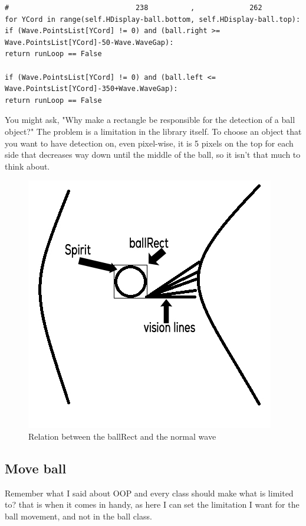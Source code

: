 \begin{listing}[H]
\begin{verbatim}
#                              238          ,             262
for YCord in range(self.HDisplay-ball.bottom, self.HDisplay-ball.top):
if (Wave.PointsList[YCord] != 0) and (ball.right >= Wave.PointsList[YCord]-50-Wave.WaveGap):
return runLoop == False

if (Wave.PointsList[YCord] != 0) and (ball.left <= Wave.PointsList[YCord]-350+Wave.WaveGap):
return runLoop == False
\end{verbatim}
\end{listing}

You might ask, "Why make a rectangle be responsible for the detection of a ball object?" The problem is a limitation in the library itself. To choose an object that you want to have detection on, even pixel-wise, it is 5 pixels on the top for each side that decreases way down until the middle of the ball, so it isn't that much to think about.

\begin{figure}[H]
	\centering
	\includegraphics[width=0.7\linewidth]{usedImages/colliison}
	\caption{Relation between the ballRect and the normal wave}
	\label{fig:colliison}
\end{figure}


\subsection{Move ball}
Remember what I said about OOP and every class should make what is limited to? that is when it comes in handy, as here I can set the limitation I want for the ball movement, and not in the ball class.

